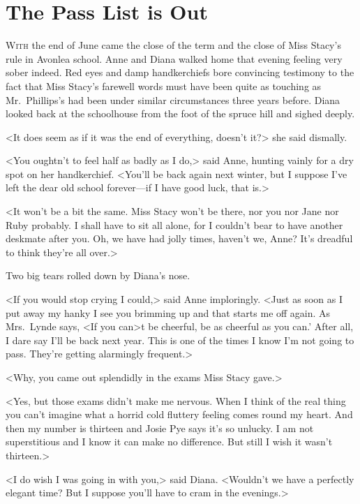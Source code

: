 \chapter{The Pass List is Out}

\lettrine[]{W}{ith} the end of June came the close of the term and the close of Miss Stacy's rule in Avonlea school. Anne and Diana walked home that evening feeling very sober indeed. Red eyes and damp handkerchiefs bore convincing testimony to the fact that Miss Stacy's farewell words must have been quite as touching as Mr.~Phillips's had been under similar circumstances three years before. Diana looked back at the schoolhouse from the foot of the spruce hill and sighed deeply.

<It does seem as if it was the end of everything, doesn't it?> she said dismally.

<You oughtn't to feel half as badly as I do,> said Anne, hunting vainly for a dry spot on her handkerchief. <You'll be back again next winter, but I suppose I've left the dear old school forever—if I have good luck, that is.>

<It won't be a bit the same. Miss Stacy won't be there, nor you nor Jane nor Ruby probably. I shall have to sit all alone, for I couldn't bear to have another deskmate after you. Oh, we have had jolly times, haven't we, Anne? It's dreadful to think they're all over.>

Two big tears rolled down by Diana's nose.

<If you would stop crying I could,> said Anne imploringly. <Just as soon as I put away my hanky I see you brimming up and that starts me off again. As Mrs.~Lynde says, <If you can>t be cheerful, be as cheerful as you can.' After all, I dare say I'll be back next year. This is one of the times I know I'm not going to pass. They're getting alarmingly frequent.>

<Why, you came out splendidly in the exams Miss Stacy gave.>

<Yes, but those exams didn't make me nervous. When I think of the real thing you can't imagine what a horrid cold fluttery feeling comes round my heart. And then my number is thirteen and Josie Pye says it's so unlucky. I am not superstitious and I know it can make no difference. But still I wish it wasn't thirteen.>

<I do wish I was going in with you,> said Diana. <Wouldn't we have a perfectly elegant time? But I suppose you'll have to cram in the evenings.>

